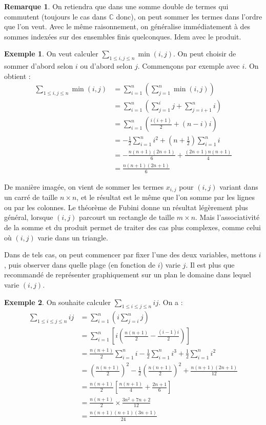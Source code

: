 \documentclass[french]{book}
\newcommand{\C}{\mathbb{C}}
\theoremstyle{plain}
\theoremstyle{definition}
\newtheorem{exa}{Exemple}[chapter]
\newtheorem{rmq}{Remarque}[chapter]
\theoremstyle{remark}
\begin{document}
\begin{rmq}
	On retiendra que dans une somme double de termes qui commutent (toujours le cas dans $\C$ donc), on peut sommer les termes dans l'ordre que l'on veut. Avec le même raisonnement, on généralise immédiatement à des sommes indexées sur des ensembles finis quelconques. Idem avec le produit.
\end{rmq}
\begin{exa}
	On veut calculer $\displaystyle \sum_{1\leqslant i,j\leqslant n}\min(i,j)$. On peut choisir de sommer d'abord selon $i$ ou d'abord selon $j$. Commençons par exemple avec $i$. On obtient : \begin{align*}
		\sum_{1\leqslant i,j\leqslant n}\min(i,j) &= \sum_{i=1}^{n}\left(\sum_{j=1}^{n}\min(i,j)\right) \\
		&=\sum_{i=1}^{n}\left(\sum_{j=1}^{i}j+\sum_{j=i+1}^{n}i\right) \\
		&=\sum_{i=1}^{n}\left(\frac{i(i+1)}{2}+(n-i)i\right) \\
		&=-\frac{1}{2}\sum_{i=1}^{n}i^2+\left(n+\frac12\right)\sum_{i=1}^{n}i \\
		&= -\frac{n(n+1)(2n+1)}{6}+\frac{(2n+1)n(n+1)}{4} \\
		&= \frac{n(n+1)(2n+1)}{6}
	\end{align*}
\end{exa}
De manière imagée, on vient de sommer les termes $x_{i,j}$ pour $(i,j)$ variant dans un carré de taille $n\times n$, et le résultat est le même que l'on somme par les lignes ou par les colonnes. Le théorème de Fubini donne un résultat légèrement plus général, lorsque $(i,j)$ parcourt un rectangle de taille $m\times n$. Mais l'associativité de la somme et du produit permet de traiter des cas plus complexes, comme celui où $(i,j)$ varie dans un triangle. \par Dans de tels cas, on peut commencer par fixer l'une des deux variables, mettons $i$, puis observer dans quelle plage (en fonction de $i$) varie $j$. Il est plus que recommandé de représenter graphiquement sur un plan le domaine dans lequel varie $(i,j)$.
\begin{exa}
	On souhaite calculer $\displaystyle \sum_{1\leqslant i\leqslant j\leqslant n}ij$. On a :
	\begin{align*}
		\sum_{1\leqslant i\leqslant j\leqslant n}ij &= \sum_{i=1}^{n}\left(i\sum_{j=i}^{n}j\right) \\
		&= \sum_{i=1}^{n}\left[i\left(\frac{n(n+1)}{2}-\frac{(i-1)i}{2}\right)\right] \\
		&=\frac{n(n+1)}{2}\sum_{i=1}^{n}i-\frac{1}{2}\sum_{i=1}^{n}i^3+\frac{1}{2}\sum_{i=1}^{n}i^2 \\
		&=\left(\frac{n(n+1)}{2}\right)^2-\frac12\left(\frac{n(n+1)}{2}\right)^2+\frac{n(n+1)(2n+1)}{12} \\
		&= \frac{n(n+1)}{2}\left[\frac{n(n+1)}{4}+\frac{2n+1}{6}\right] \\
		&= \frac{n(n+1)}{2}\times\frac{3n^2+7n+2}{12}\\
		&= \frac{n(n+1)(n+1)(3n+1)}{24}		
	\end{align*}
\end{exa}
\end{document}
